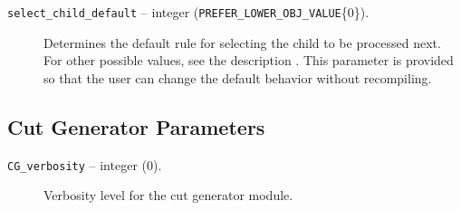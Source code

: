 \begin{description}
\item[{\tt select\_child\_default} -- integer 
({\tt PREFER\_LOWER\_OBJ\_VALUE}\{0\}).]
Determines the default rule for selecting the child to be processed
next. For other possible values, see the description . This
parameter is provided so that the user can change the default behavior
without recompiling.

\end{description}

\subsection{Cut Generator Parameters}

\begin{description}

\item[{\tt CG\_verbosity} -- integer (0).]
Verbosity level for the cut generator module.

\end{description}

